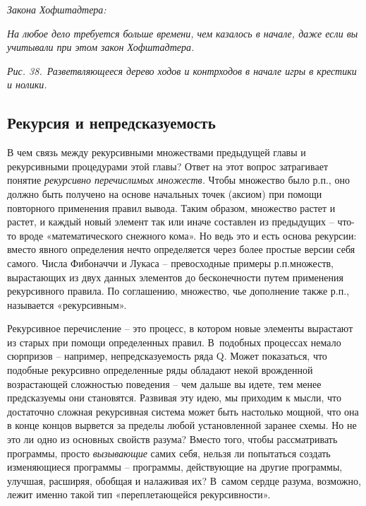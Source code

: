 \documentclass[../main.tex]{subfiles}
\begin{document}
\emph{Закона Хофштадтера:}

\emph{На любое дело требуется больше времени, чем казалось в начале, даже если вы учитывали при этом закон Хофштадтера.}

\emph{Рис. 38.~Разветвляющееся дерево ходов и контрходов в начале игры в крестики и нолики.}


\subsection{Рекурсия и непредсказуемость}

В чем связь между рекурсивными множествами предыдущей главы и рекурсивными процедурами этой главы? Ответ на этот вопрос затрагивает понятие \emph{рекурсивно перечислимых множеств.} Чтобы множество было р.п., оно должно быть получено на основе начальных точек (аксиом) при помощи повторного применения правил вывода. Таким образом, множество растет и растет, и каждый новый элемент так или иначе составлен из предыдущих \--- что-то вроде «математического снежного кома». Но ведь это и есть основа рекурсии: вместо явного определения нечто определяется через более простые версии себя самого. Числа Фибоначчи и Лукаса \--- превосходные примеры р.п.\@ множеств, вырастающих из двух данных элементов до бесконечности путем применения рекурсивного правила. По соглашению, множество, чье дополнение также р.п., называется «рекурсивным».

Рекурсивное перечисление \--- это процесс, в котором новые элементы вырастают из старых при помощи определенных правил. В~подобных процессах немало сюрпризов \--- например, непредсказуемость ряда Q\@. Может показаться, что подобные рекурсивно определенные ряды обладают некой врожденной возрастающей сложностью поведения \--- чем дальше вы идете, тем менее предсказуемы они становятся. Развивая эту идею, мы приходим к мысли, что достаточно сложная рекурсивная система может быть настолько мощной, что она в конце концов вырвется за пределы любой установленной заранее схемы. Но не это ли одно из основных свойств разума? Вместо того, чтобы рассматривать программы, просто \emph{вызывающие} самих себя, нельзя ли попытаться создать изменяющиеся программы \--- программы, действующие на другие программы, улучшая, расширяя, обобщая и налаживая их? В~самом сердце разума, возможно, лежит именно такой тип «переплетающейся рекурсивности».
\end{document}
